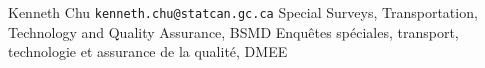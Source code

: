 
\begin{frame}{}

\begin{center}
\vskip 2.5cm
\end{center}

\begin{center}
\vskip 0.5cm
{\Large Kenneth Chu}
\vskip 0.1cm
\texttt{kenneth.chu@statcan.gc.ca}
\vskip 0.1cm
{\small Special Surveys, Transportation, Technology and Quality Assurance, BSMD
\vskip 0.0cm
Enqu\^{e}tes sp\'{e}ciales, transport, technologie et assurance de la qualit\'{e}, DMEE
}
\end{center}

\end{frame}
\normalsize


